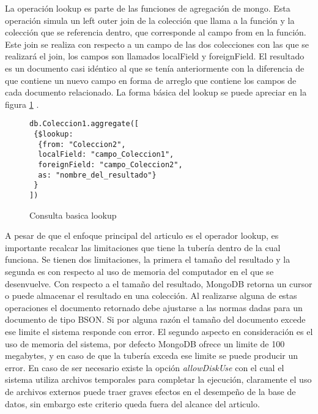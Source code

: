 \documentclass[conference,compsoc]{sty/IEEEtran}
\begin{document}
La operación lookup es parte de las funciones de agregación de mongo. Esta operación simula un left outer join de la colección que llama a la función y la colección que se referencia dentro, que corresponde al campo from en la función. Este join se realiza con respecto a un campo de las dos colecciones con las que se realizará el join, los campos son llamados localField y foreignField.  El resultado es un documento casi idéntico al que se tenía anteriormente con la diferencia de que contiene un nuevo campo en forma de arreglo que contiene los campos de cada documento relacionado. La forma básica del lookup se puede apreciar en la figura \ref{fig:consulta-basica-lookup} \cite{lookupMongo}.

\begin{figure}
    \begin{verbatim}
db.Coleccion1.aggregate([
 {$lookup:
  {from: "Coleccion2",
  localField: "campo_Coleccion1",
  foreignField: "campo_Coleccion2",
  as: "nombre_del_resultado"}
 }
])
\end{verbatim}
\caption{Consulta basica lookup} 
\label{fig:consulta-basica-lookup}
\end{figure}


A pesar de que el enfoque principal del articulo es el operador lookup, es importante recalcar las limitaciones que tiene la tubería dentro de la cual funciona. Se tienen dos limitaciones, la primera el tamaño del resultado y la segunda es con respecto al uso de memoria del computador en el que se desenvuelve. 
Con respecto a el tamaño del resultado, MongoDB retorna un cursor o puede almacenar el resultado en una colección. Al realizarse alguna de estas operaciones el documento retornado debe ajustarse a las normas dadas para un documento de tipo BSON. Si por alguna razón el tamaño del documento excede ese limite el sistema responde con error. 
El segundo aspecto en consideración es el uso de memoria del sistema, por defecto MongoDB ofrece un limite de 100 megabytes, y en caso de que la tubería exceda ese limite se puede producir un error. En caso de ser necesario existe la opción \textit{allowDiskUse} con el cual el sistema utiliza archivos temporales para completar la ejecución, claramente el uso de archivos externos puede traer graves efectos en el desempeño de la base de datos, sin embargo este criterio queda fuera del alcance del articulo.
\end{document}
